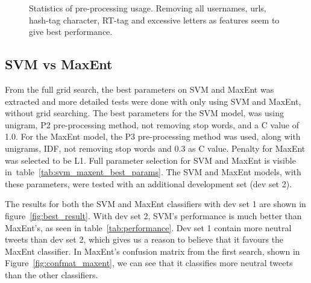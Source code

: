 \begin{figure}[!htb]
	\centering
	\caption[Statistics of pre-processing usage.]{Statistics of pre-processing usage. Removing all usernames, urls, hash-tag character, RT-tag and excessive letters as features seem to give best performance.}
	\label{fig:preprocess_usage}
\end{figure}

\clearpage
\subsection{SVM vs MaxEnt}

From the full grid search, the best parameters on SVM and MaxEnt was extracted and more detailed tests were done with only using SVM and MaxEnt, without grid searching. The best parameters for the SVM model, was using unigram, P2 pre-processing method, not removing stop words, and a C value of 1.0. For the MaxEnt model, the P3 pre-processing method was used, along with unigrams, IDF, not removing stop words and 0.3 as C value. Penalty for MaxEnt was selected to be L1. Full parameter selection for SVM and MaxEnt is visible in~table~\ref{tab:svm_maxent_best_params}. The SVM and MaxEnt models, with these parameters, were tested with an additional development set (dev set 2).

The results for both the SVM and MaxEnt classifiers with dev set 1 are shown in figure~\ref{fig:best_result}. With dev set 2, SVM's performance is much better than MaxEnt's, as seen in table~\ref{tab:performance}. Dev set 1 contain more neutral tweets than dev set 2, which gives us a reason to believe that it favours the MaxEnt classifier. In MaxEnt's confusion matrix from the first search, shown in Figure~\ref{fig:confmat_maxent}, we can see that it classifies more neutral tweets than the other classifiers.

